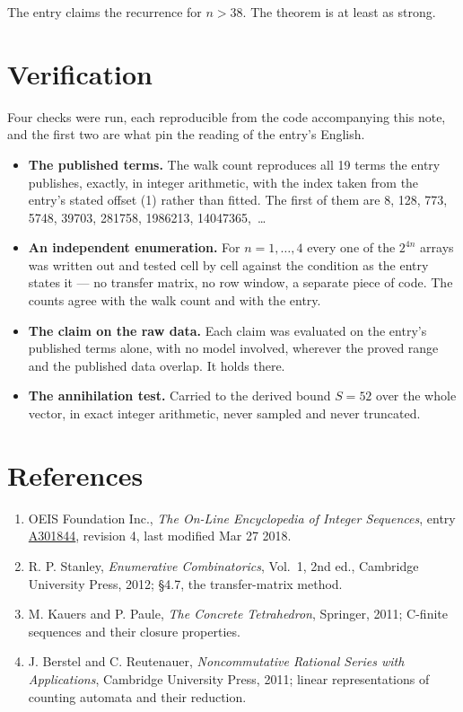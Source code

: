 \documentclass[11pt]{article}
\theoremstyle{definition}
\begin{document}
The entry claims the recurrence for $n > 38$. The theorem is at least as strong.

\section{Verification}

Four checks were run, each reproducible from the code accompanying this note, and the first two are what pin the reading of the entry's English.

\begin{itemize}

\item {\bfseries The published terms.} The walk count reproduces all 19 terms the entry publishes, exactly, in integer arithmetic, with the index taken from the entry's stated offset (1) rather than fitted. The first of them are 8, 128, 773, 5748, 39703, 281758, 1986213, 14047365,~\dots

\item {\bfseries An independent enumeration.} For $n = 1,\dots,4$ every one of the $2^{4n}$ arrays was written out and tested cell by cell against the condition as the entry states it --- no transfer matrix, no row window, a separate piece of code. The counts agree with the walk count and with the entry.

\item {\bfseries The claim on the raw data.} Each claim was evaluated on the entry's published terms alone, with no model involved, wherever the proved range and the published data overlap. It holds there.

\item {\bfseries The annihilation test.} Carried to the derived bound $S = 52$ over the whole vector, in exact integer arithmetic, never sampled and never truncated.

\end{itemize}

\section{References}

\begin{enumerate}

\item OEIS Foundation Inc., \emph{The On-Line Encyclopedia of Integer Sequences}, entry \href{https://oeis.org/A301844}{A301844}, revision 4, last modified Mar 27 2018.

\item R. P. Stanley, \emph{Enumerative Combinatorics}, Vol.~1, 2nd ed., Cambridge University Press, 2012; \S4.7, the transfer-matrix method.

\item M. Kauers and P. Paule, \emph{The Concrete Tetrahedron}, Springer, 2011; C-finite sequences and their closure properties.

\item J. Berstel and C. Reutenauer, \emph{Noncommutative Rational Series with Applications}, Cambridge University Press, 2011; linear representations of counting automata and their reduction.

\end{enumerate}
\end{document}
